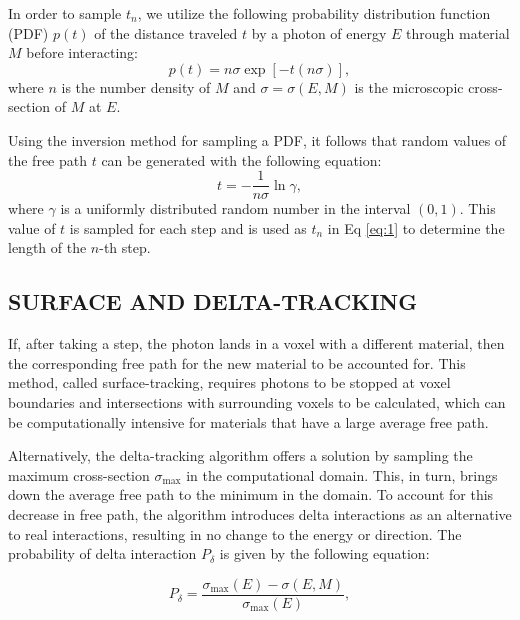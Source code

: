 \documentclass[%
 aip,
cp,  %
 amsmath,amssymb,%
reprint,%
]{revtex4-2}
\begin{document}
\par In order to sample $t_n$, we utilize the following probability distribution function (PDF) $p(t)$ of the distance traveled $t$ by a photon of energy $E$ through material $M$ before interacting:
\begin{equation}\label{eq:2}
    p(t) = n\sigma \exp{\left[-t(n\sigma)\right]},
\end{equation}
where $n$ is the number density of $M$ and $\sigma = \sigma(E, M)$ is the microscopic cross-section of $M$ at $E$.
\par Using the inversion method for sampling a PDF, it follows that random values of the free path $t$ can be generated with the following equation:
\begin{equation}\label{eq:3}
    t = -\frac{1}{n\sigma} \ln \gamma,
\end{equation}
where $\gamma$ is a uniformly distributed random number in the interval $(0, 1)$. This value of $t$ is sampled for each step and is used as $t_n$ in Eq \ref{eq:1} to determine the length of the $n$-th step.
\\

\subsection{SURFACE AND DELTA-TRACKING}

\par If, after taking a step, the photon lands in a voxel with a different material, then the corresponding free path for the new material to be accounted for. This method, called surface-tracking, requires photons to be stopped at voxel boundaries and intersections with surrounding voxels to be calculated, which can be computationally intensive for materials that have a large average free path. 
\par Alternatively, the delta-tracking algorithm offers a solution by sampling the maximum cross-section $\sigma_{\text{max}}$ in the computational domain. This, in turn, brings down the average free path to the minimum in the domain. To account for this decrease in free path, the algorithm introduces delta interactions as an alternative to real interactions, resulting in no change to the energy or direction. The probability of delta interaction $P_{\delta}$ is given by the following equation:

\begin{equation} \label{eq:4}
    P_{\delta} = \frac{\sigma_{\text{max}}(E) - \sigma(E, M)}{\sigma_{\text{max}}(E)},
\end{equation}
\end{document}
